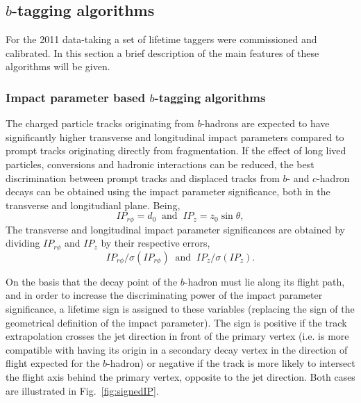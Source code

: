 \subsection{$b$-tagging algorithms}

For the 2011 data-taking a set of lifetime taggers were commissioned and calibrated. In this section a brief description of the main features of these algorithms will be given. 

\subsubsection{Impact parameter based $b$-tagging algorithms }


The charged particle tracks originating from $b$-hadrons are expected to have significantly higher transverse and longitudinal impact parameters compared to prompt tracks originating directly from fragmentation. If the effect of long lived particles, conversions and hadronic interactions can be reduced, the best discrimination between prompt tracks and displaced tracks from $b$- and $c$-hadron decays can be obtained using the impact parameter significance, both in the transverse and longitudianl plane. Being,
\begin{equation}
    IP_{r\phi} = d_0\;\;  \mbox{and} \;\;  IP_{z} = z_0 \sin \theta,
\end{equation}
The transverse and longitudinal impact parameter significances are obtained by dividing $IP_{r\phi}$ and $IP_z$ by their respective errors,
\begin{equation}
    IP_{r\phi}/\sigma(IP_{r\phi})\;\; \mbox{and} \;\;  IP_{z}/\sigma(IP_{z}).
\end{equation}
%

On the basis that the decay point of the $b$-hadron must lie along its flight path, and in order to increase the discriminating power of the impact parameter significance, a lifetime sign is assigned to these variables (replacing the sign of the geometrical definition of the impact parameter). The sign is positive if the track extrapolation crosses the jet direction in front of the primary vertex (i.e. is more compatible with having its origin in a secondary decay vertex in the direction of flight expected for the $b$-hadron) or negative if the track is more likely to intersect the flight axis behind the primary vertex, opposite to the jet direction. Both cases are illustrated in Fig.~\ref{fig:signedIP}. 

